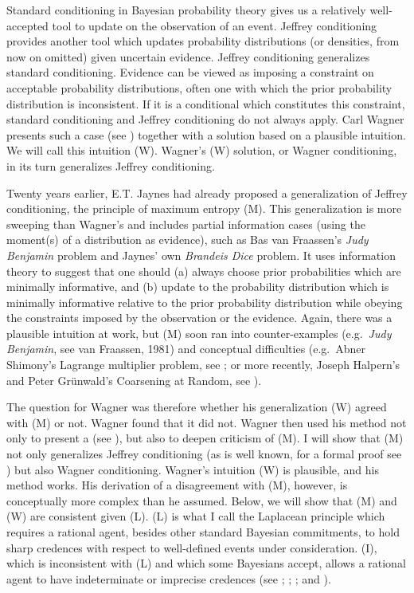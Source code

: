 \documentclass[11pt]{article}
\begin{document}
Standard conditioning in Bayesian probability theory gives us a
relatively well-accepted tool to update on the observation of an
event. Jeffrey conditioning provides another tool which updates
probability distributions (or densities, from now on omitted) given
uncertain evidence. Jeffrey conditioning generalizes standard
conditioning. Evidence can be viewed as imposing a constraint on
acceptable probability distributions, often one with which the prior
probability distribution is inconsistent. If it is a conditional which
constitutes this constraint, standard conditioning and Jeffrey
conditioning do not always apply. Carl Wagner presents such a case
(see ) together with a solution based on a
plausible intuition. We will call this intuition (W). Wagner's (W)
solution, or Wagner conditioning, in its turn generalizes Jeffrey
conditioning.

Twenty years earlier, E.T. Jaynes had already proposed a
generalization of Jeffrey conditioning, the principle of maximum
entropy (M). This generalization is more sweeping than Wagner's and
includes partial information cases (using the moment(s) of a
distribution as evidence), such as Bas van Fraassen's \emph{Judy
  Benjamin} problem and Jaynes' own \emph{Brandeis Dice} problem. It
uses information theory to suggest that one should (a) always choose
prior probabilities which are minimally informative, and (b) update to
the probability distribution which is minimally informative relative
to the prior probability distribution while obeying the constraints
imposed by the observation or the evidence. Again, there was a
plausible intuition at work, but (M) soon ran into counter-examples
(e.g.\ \emph{Judy Benjamin}, see van Fraassen, 1981) and conceptual
difficulties (e.g.\ Abner Shimony's Lagrange multiplier problem, see
; or more recently, Joseph Halpern's and
Peter Gr{\"u}nwald's Coarsening at Random, see
).

The question for Wagner was therefore whether his generalization (W)
agreed with (M) or not. Wagner found that it did not. Wagner then used
his method not only to present a  (see ), but also to
deepen criticism of (M). I will show that (M) not only generalizes
Jeffrey conditioning (as is well known, for a formal proof see
) but also Wagner conditioning. Wagner's
intuition (W) is plausible, and his method works. His derivation of a
disagreement with (M), however, is conceptually more complex than he
assumed. Below, we will show that (M) and (W) are consistent given
(L). (L) is what I call the Laplacean principle which requires a
rational agent, besides other standard Bayesian commitments, to hold
sharp credences with respect to well-defined events under
consideration. (I), which is inconsistent with (L) and which some
Bayesians accept, allows a rational agent to have indeterminate or
imprecise credences (see ; ;
; 
and ).
\end{document}
